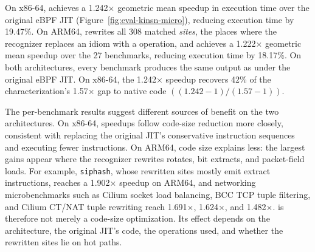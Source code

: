 On x86-64, \lang achieves a 1.242$\times$ geometric mean speedup in execution time over the original eBPF JIT (Figure~\ref{fig:eval-kinsn-micro}), reducing execution time by 19.47\%.
On ARM64, \lang rewrites all 308 matched \emph{sites}, the places where the recognizer replaces an idiom with a \lang operation, and achieves a 1.222$\times$ geometric mean speedup over the 27 benchmarks, reducing execution time by 18.17\%.
On both architectures, every benchmark produces the same output as under the original eBPF JIT.
On x86-64, the 1.242$\times$ speedup recovers 42\% of the characterization's 1.57$\times$ gap to native code $((1.242{-}1)/(1.57{-}1))$.



The per-benchmark results suggest different sources of benefit on the two architectures.
On x86-64, speedups follow code-size reduction more closely, consistent with \lang replacing the original JIT's conservative instruction sequences and executing fewer instructions.
On ARM64, code size explains less: the largest gains appear where the recognizer rewrites rotates, bit extracts, and packet-field loads.
For example, \texttt{siphash}, whose rewritten sites mostly emit extract instructions, reaches a 1.902$\times$ speedup on ARM64, and networking microbenchmarks such as Cilium socket load balancing, BCC TCP tuple filtering, and Cilium CT/NAT tuple rewriting reach 1.691$\times$, 1.624$\times$, and 1.482$\times$.
\lang is therefore not merely a code-size optimization. Its effect depends on the architecture, the original JIT's code, the \lang operations used, and whether the rewritten sites lie on hot paths.

